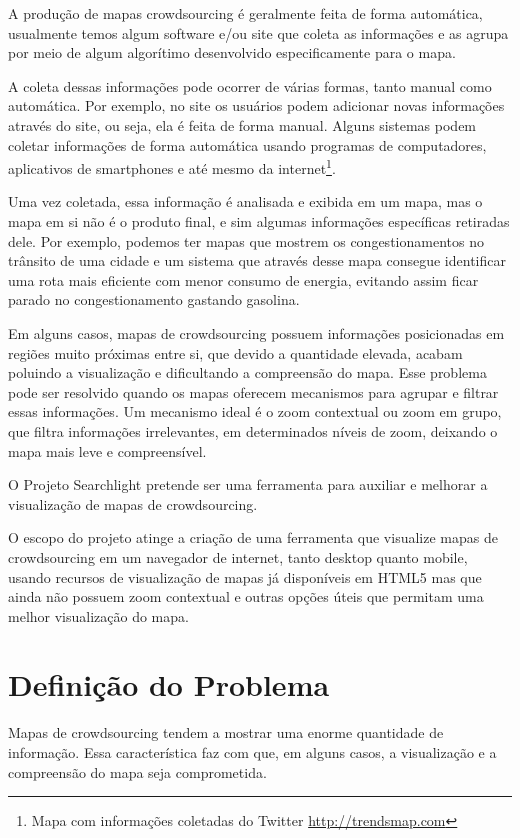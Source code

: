 A produção de mapas crowdsourcing é geralmente feita de forma automática, usualmente temos algum software e/ou site que coleta as informações e as agrupa por meio de algum algorítimo desenvolvido especificamente para o mapa.

A coleta dessas informações pode ocorrer de várias formas, tanto manual como automática. Por exemplo, no site  os usuários podem adicionar novas informações através do site, ou seja, ela é feita de forma manual. Alguns sistemas podem coletar informações de forma automática usando programas de computadores, aplicativos de smartphones \cite{thiagarajan_cooperative_2010}  e até mesmo da internet\footnote{ Mapa com informações coletadas do Twitter \url{http://trendsmap.com}}.

Uma vez coletada, essa informação é analisada e exibida em um mapa, mas o mapa em si não é o produto final, e sim algumas informações específicas retiradas dele. Por exemplo, podemos ter mapas que mostrem os congestionamentos no trânsito de uma cidade e um sistema \cite{thiagarajan_vtrack:_2009} que através desse mapa consegue identificar  uma rota mais eficiente com menor consumo de energia, evitando assim ficar parado no congestionamento gastando gasolina.

Em alguns casos, mapas de crowdsourcing possuem informações posicionadas em regiões muito próximas entre si, que devido a quantidade elevada, acabam poluindo a visualização e dificultando a compreensão do mapa. Esse problema pode ser resolvido quando os mapas oferecem mecanismos para agrupar e filtrar essas informações. Um mecanismo ideal é o zoom contextual ou zoom em grupo, que filtra informações irrelevantes, em determinados níveis de zoom, deixando o mapa mais leve e compreensível.

O Projeto Searchlight pretende ser uma ferramenta para auxiliar e melhorar a visualização de mapas de crowdsourcing.

O escopo do projeto atinge a criação de uma ferramenta que visualize mapas de crowdsourcing em um navegador de internet, tanto desktop quanto mobile, usando recursos de visualização de mapas já disponíveis em HTML5 mas que ainda não possuem zoom contextual e outras opções úteis que permitam uma melhor visualização do mapa.



\section{Definição do Problema}
Mapas de crowdsourcing tendem a mostrar uma enorme quantidade de informação. Essa característica faz com que, em alguns casos, a visualização e a compreensão do mapa seja comprometida.
 
